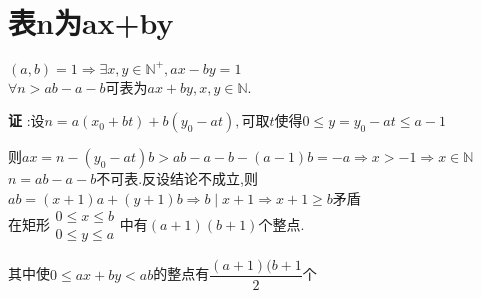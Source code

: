 \section{表n为ax+by}
$(a,b)=1\Rightarrow \exists x,y\in \mathbb{N}^+,ax-by=1$
\\

$ \forall n>ab-a-b$可表为$ ax+by,x,y\in \mathbb{N}$.

{\bf 证 }:设$ n=a(x_0+bt)+b(y_0-at),$可取$ t$使得$ 0 \le y =y_0-at\le a-1$

则$ ax=n-(y_0-at)b>ab-a-b-(a-1)b=-a\Rightarrow x>-1\Rightarrow x\in \mathbb{N}$
\\

$ n=ab-a-b$不可表.反设结论不成立,则
$ ab=(x+1)a+(y+1)b\Rightarrow b\mid x+1\Rightarrow x+1\ge b$矛盾
\\

在矩形$\begin{matrix} 0\le x\le b\\ 0\le y\le a \end{matrix} $中有$ (a+1)(b+1)$个整点.

其中使$ 0\le ax+by<ab$的整点有$ \dfrac{(a+1)(b+1}{2}$个
